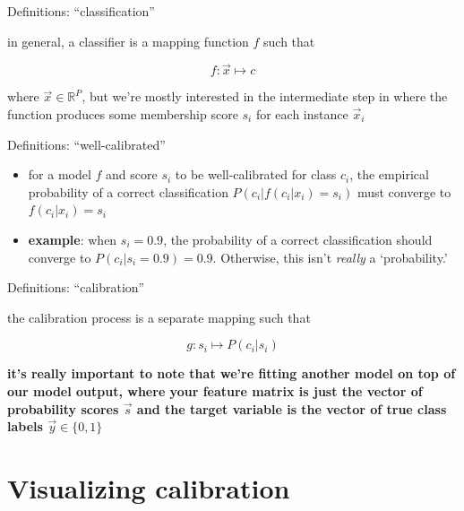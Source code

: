 \documentclass[ignorenonframetext,]{beamer}
\providecommand{\tightlist}{%
\setlength{\itemsep}{0pt}\setlength{\parskip}{0pt}}
\begin{document}
\begin{frame}{Definitions: ``classification''}

in general, a classifier is a mapping function \(f\) such that

\[f: \vec{x} \mapsto c\]

where \(\vec{x} \in \mathbb{R}^{P}\), but we're mostly interested in the
intermediate step in where the function produces some membership score
\(s_i\) for each instance \(\vec{x}_i\)

\end{frame}

\begin{frame}{Definitions: ``well-calibrated''}

\begin{itemize}
\tightlist
\item
  for a model \(f\) and score \(s_i\) to be well-calibrated for class
  \(c_i\), the empirical probability of a correct classification
  \(P(c_i | f( c_i | x_i)=s_i)\) must converge to \(f(c_i | x_i) = s_i\)
  \vspace{5mm}
\item
  \textbf{example}: when \(s_i = 0.9\), the probability of a correct
  classification should converge to \(P(c_i | s_i = 0.9) = 0.9\).
  Otherwise, this isn't \textit{really} a `probability.'
\end{itemize}

\end{frame}

\begin{frame}{Definitions: ``calibration''}

the calibration process is a separate mapping such that

\[g: s_i \mapsto P(c_i | s_i)\]

\textbf{it's really important to note that we're fitting another model
on top of our model output, where your feature matrix is just the vector
of probability scores \(\vec{s}\) and the target variable is the vector
of true class labels \(\vec{y} \in \{0,1\}\)}

\end{frame}

\section{Visualizing calibration}\label{visualizing-calibration}
\end{document}
